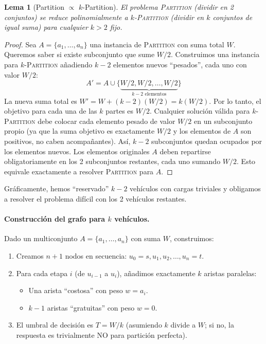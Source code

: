 \documentclass[11pt]{article}
\newtheorem{lemma}{Lema}
\begin{document}
\begin{lemma}[Partition $\propto$ $k$-Partition]
El problema \textsc{Partition} (dividir en 2 conjuntos) se reduce polinomialmente a \textsc{$k$-Partition} (dividir en $k$ conjuntos de igual suma) para cualquier $k > 2$ fijo.
\end{lemma}
\begin{proof}
Sea $A=\{a_1,\dots,a_n\}$ una instancia de \textsc{Partition} con suma total $W$. Queremos saber si existe subconjunto que sume $W/2$.
Construimos una instancia para \textsc{$k$-Partition} añadiendo $k-2$ elementos nuevos ``pesados'', cada uno con valor $W/2$:
\[ A' = A \cup \{ \underbrace{W/2, W/2, \dots, W/2}_{k-2 \text{ elementos}} \} \]
La nueva suma total es $W' = W + (k-2)(W/2) = k(W/2)$. Por lo tanto, el objetivo para cada una de las $k$ partes es $W/2$.
Cualquier solución válida para \textsc{$k$-Partition} debe colocar cada elemento pesado de valor $W/2$ en un subconjunto propio (ya que la suma objetivo es exactamente $W/2$ y los elementos de $A$ son positivos, no caben acompañantes). Así, $k-2$ subconjuntos quedan ocupados por los elementos nuevos. Los elementos originales $A$ deben repartirse obligatoriamente en los 2 subconjuntos restantes, cada uno sumando $W/2$. Esto equivale exactamente a resolver \textsc{Partition} para $A$.
\end{proof}

Gráficamente, hemos ``reservado'' $k-2$ vehículos con cargas triviales y obligamos a resolver el problema difícil con los 2 vehículos restantes.

\paragraph{Construcción del grafo para $k$ vehículos.} Dado un multiconjunto $A=\{a_1,\dots,a_n\}$ con suma $W$, construimos:
\begin{enumerate}
  \item Creamos $n+1$ nodos en secuencia: $u_0=s, u_1, u_2, \dots, u_n=t$.
  \item Para cada etapa $i$ (de $u_{i-1}$ a $u_i$), añadimos exactamente $k$ aristas paralelas:
  \begin{itemize}
    \item Una arista ``costosa'' con peso $w=a_i$.
    \item $k-1$ aristas ``gratuitas'' con peso $w=0$.
  \end{itemize}
  \item El umbral de decisión es $T = W/k$ (asumiendo $k$ divide a $W$; si no, la respuesta es trivialmente NO para partición perfecta).
\end{enumerate}
\end{document}
